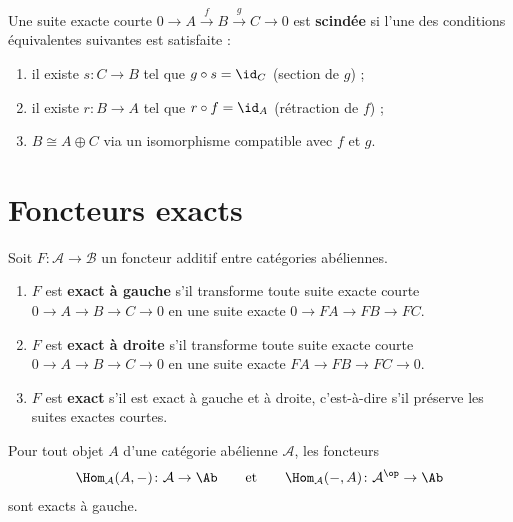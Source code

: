 \begin{definition}\label{def:split-ses}
Une suite exacte courte
$0 \to A \xrightarrow{f} B \xrightarrow{g} C \to 0$
est \textbf{scindée} si l'une des conditions équivalentes suivantes
est satisfaite :
\begin{enumerate}[label=(\roman*)]
\item il existe $s \colon C \to B$ tel que $g \circ s = \id_C$
  (section de $g$) ;
\item il existe $r \colon B \to A$ tel que $r \circ f = \id_A$
  (rétraction de $f$) ;
\item $B \cong A \oplus C$ via un isomorphisme compatible avec $f$ et $g$.
\end{enumerate}
\end{definition}


\section{Foncteurs exacts}\label{sec:exact-functors}

\begin{definition}\label{def:exact-functor}
Soit $F \colon \mathcal{A} \to \mathcal{B}$ un foncteur additif entre
catégories abéliennes.
\begin{enumerate}[label=(\roman*)]
\item $F$ est \textbf{exact à gauche}
  s'il transforme toute suite exacte courte
  $0 \to A \to B \to C \to 0$ en une suite exacte
  $0 \to FA \to FB \to FC$.

\item $F$ est \textbf{exact à droite}
  s'il transforme toute suite exacte courte
  $0 \to A \to B \to C \to 0$ en une suite exacte
  $FA \to FB \to FC \to 0$.

\item $F$ est \textbf{exact}
  s'il est exact à gauche et à droite, c'est-à-dire s'il préserve
  les suites exactes courtes.
\end{enumerate}
\end{definition}

\begin{proposition}\label{prop:hom-left-exact}
Pour tout objet $A$ d'une catégorie abélienne $\mathcal{A}$, les
foncteurs
\[
  \Hom_{\mathcal{A}}(A, -) \colon \mathcal{A} \to \Ab
  \qquad \text{et} \qquad
  \Hom_{\mathcal{A}}(-, A) \colon \mathcal{A}^{\op} \to \Ab
\]
sont exacts à gauche.
\end{proposition}

